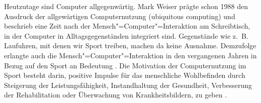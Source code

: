 

Heutzutage sind Computer allgegenwärtig. Mark Weiser prägte schon 1988 den Ausdruck der allgewärtigen Computernutzung (ubiquitous computing) und beschrieb eine Zeit nach der Mensch"=Computer"=Interaktion am Schreibtisch, in der Computer in Alltagsgegenständen integriert sind. Gegenstände wie z.~B. Laufuhren, mit denen wir Sport treiben, machen da keine Ausnahme. Demzufolge erlangte auch die Mensch"=Computer"=Interaktion in den vergangenen Jahren in Bezug auf den Sport an Bedeutung \citep{Nylander2014}. Die Motivation der Computernutzung im Sport besteht darin, positive Impulse für das menschliche Wohlbefinden durch Steigerung der Leistungsfähigkeit, Instandhaltung der Gesundheit, Verbesserung der Rehabilitation oder Überwachung von Krankheitsbildern, zu geben \citep{DigitalSportsGroupatthePatternRecognitionLab}. 
